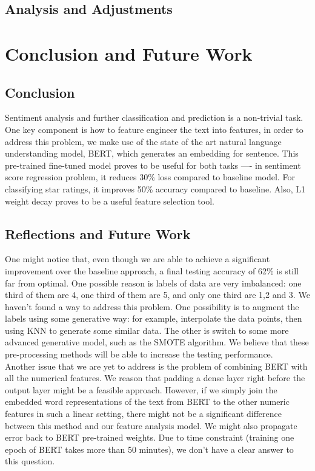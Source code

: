 \documentclass{article}
\begin{document}
\subsection{Analysis and Adjustments}

\section{Conclusion and Future Work}
\subsection{Conclusion}
Sentiment analysis and further classification and prediction is a non-trivial task. One key component is how to feature engineer the text into features, in order to address this problem, we make use of the state of the art natural language understanding model, BERT, which generates an embedding for sentence. This pre-trained fine-tuned model proves to be useful for both tasks ---- in sentiment score regression problem, it reduces 30\% loss compared to baseline model. For classifying star ratings, it improves 50\% accuracy compared to baseline. Also, L1 weight decay proves to be a useful feature selection tool. \\

\subsection{Reflections and Future Work}
One might notice that, even though we are able to achieve a significant improvement over the baseline approach, a final testing accuracy of 62\% is still far from optimal. One possible reason is labels of data are very imbalanced: one third of them are 4, one third of them are 5, and only one third are 1,2 and 3. We haven’t found a way to address this problem. One possibility is to augment the labels using some generative way: for example, interpolate the data points, then using KNN to generate some similar data. The other is switch to some more advanced generative model, such as the SMOTE algorithm. %
 We believe that these pre-processing methods will be able to increase the testing performance. \\

Another issue that we are yet to address is the problem of combining BERT with all the numerical features. We reason that padding a dense layer right before the output layer might be a feasible approach. However, if we simply join the embedded word representations of the text from BERT to the other numeric features in such a linear setting, there might not be a significant difference between this method and our feature analysis model. We might also propagate error back to BERT pre-trained weights. Due to time constraint (training one epoch of BERT takes more than 50 minutes), we don’t have a clear answer to this question. \\
\end{document}
